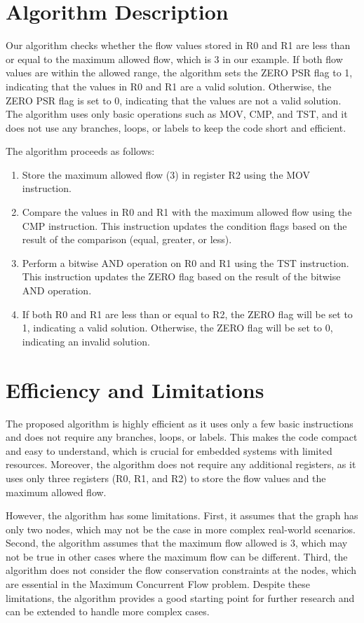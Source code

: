 \section{Algorithm Description}

Our algorithm checks whether the flow values stored in R0 and R1 are less than or equal to the maximum allowed flow, which is 3 in our example. If both flow values are within the allowed range, the algorithm sets the ZERO PSR flag to 1, indicating that the values in R0 and R1 are a valid solution. Otherwise, the ZERO PSR flag is set to 0, indicating that the values are not a valid solution. The algorithm uses only basic operations such as MOV, CMP, and TST, and it does not use any branches, loops, or labels to keep the code short and efficient.

The algorithm proceeds as follows:

\begin{enumerate}
    \item Store the maximum allowed flow (3) in register R2 using the MOV instruction.
    \item Compare the values in R0 and R1 with the maximum allowed flow using the CMP instruction. This instruction updates the condition flags based on the result of the comparison (equal, greater, or less).
    \item Perform a bitwise AND operation on R0 and R1 using the TST instruction. This instruction updates the ZERO flag based on the result of the bitwise AND operation.
    \item If both R0 and R1 are less than or equal to R2, the ZERO flag will be set to 1, indicating a valid solution. Otherwise, the ZERO flag will be set to 0, indicating an invalid solution.
\end{enumerate}

\section{Efficiency and Limitations}

The proposed algorithm is highly efficient as it uses only a few basic instructions and does not require any branches, loops, or labels. This makes the code compact and easy to understand, which is crucial for embedded systems with limited resources. Moreover, the algorithm does not require any additional registers, as it uses only three registers (R0, R1, and R2) to store the flow values and the maximum allowed flow.

However, the algorithm has some limitations. First, it assumes that the graph has only two nodes, which may not be the case in more complex real-world scenarios. Second, the algorithm assumes that the maximum flow allowed is 3, which may not be true in other cases where the maximum flow can be different. Third, the algorithm does not consider the flow conservation constraints at the nodes, which are essential in the Maximum Concurrent Flow problem. Despite these limitations, the algorithm provides a good starting point for further research and can be extended to handle more complex cases.

